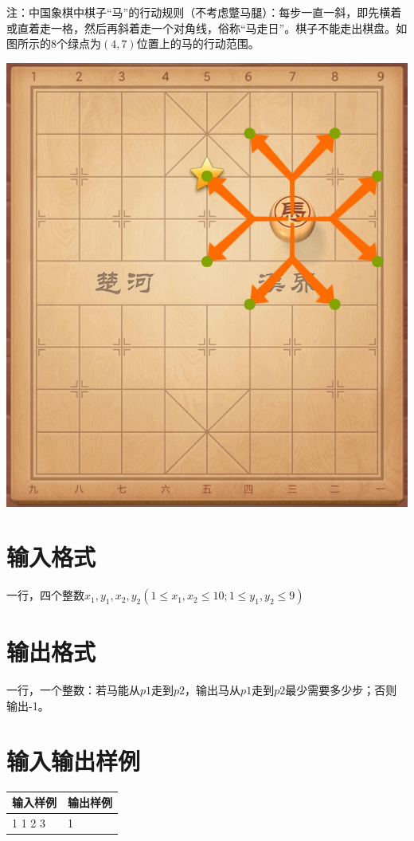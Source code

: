 \documentclass[
	lang=cn,
	color=green
]{elegantbook}
\begin{document}
注：中国象棋中棋子“马”的行动规则（不考虑蹩马腿）：每步一直一斜，即先横着或直着走一格，然后再斜着走一个对角线，俗称“马走日”。棋子不能走出棋盘。如图所示的$8$个绿点为$(4,7)$位置上的马的行动范围。

\begin{center}
	\includegraphics[scale=0.1]{images/chess.jpg}
\end{center}

\section*{输入格式}
一行，四个整数$x_1,y_1,x_2,y_2(1 \leq x_1,x_2 \leq 10; 1 \leq y_1,y_2 \leq 9)$

\section*{输出格式}
一行，一个整数：若马能从$p1$走到$p2$，输出马从$p1$走到$p2$最少需要多少步；否则输出-1。

\section*{输入输出样例}
\begin{tabularx}{450pt}{X|X}
	\toprule
	输入样例 & 输出样例 \\
	\midrule
	1 1 2 3  & 1        \\
	\bottomrule
\end{tabularx}
\vspace{0.5cm}
\end{document}
